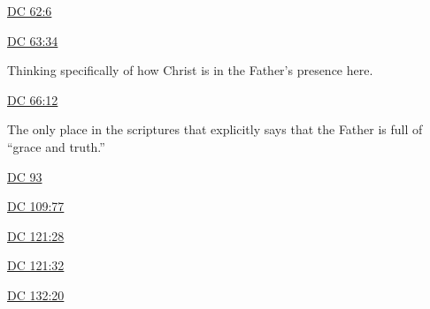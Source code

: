 		\begin{compactdesc}
			\item[{\hyperref[DC62-6]{DC 62:6}}]
			\item[{\hyperref[DC63-34]{DC 63:34}}]
				\begin{compactitem}
					\item Thinking specifically of how Christ is in the Father's presence here.
				\end{compactitem}
			\item[{\hyperref[DC66-12]{DC 66:12}}]
				\begin{compactitem}
					\item The only place in the scriptures that explicitly says that the Father is full of ``grace and truth.''
				\end{compactitem}
			\item[{\hyperref[DC93]{DC 93}}]
			\item[{\hyperref[DC109-77]{DC 109:77}}]
			\item[{\hyperref[DC121-28]{DC 121:28}}]
			\item[{\hyperref[DC121-32]{DC 121:32}}]
			\item[{\hyperref[DC132-20]{DC 132:20}}]
		\end{compactdesc}
		
	
		
		

	
